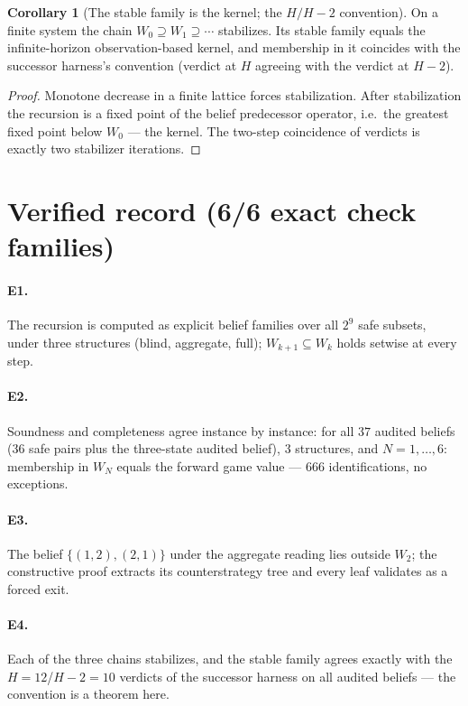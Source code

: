 \documentclass[10pt,twocolumn]{article}
\theoremstyle{definition}
\newtheorem{corollary}{Corollary}
\begin{document}
\begin{corollary}[The stable family is the kernel; the $H/H-2$ convention]
On a finite system the chain $W_0\supseteq W_1\supseteq\cdots$ stabilizes.
Its stable family equals the infinite-horizon observation-based kernel, and
membership in it coincides with the successor harness's convention
(verdict at $H$ agreeing with the verdict at $H-2$).
\end{corollary}
\begin{proof}
Monotone decrease in a finite lattice forces stabilization. After
stabilization the recursion is a fixed point of the belief predecessor
operator, i.e.\ the greatest fixed point below $W_0$ --- the kernel. The
two-step coincidence of verdicts is exactly two stabilizer iterations.
\end{proof}

\section{Verified record (6/6 exact check families)}

\paragraph{E1.} The recursion is computed as explicit belief families over
all $2^9$ safe subsets, under three structures (blind, aggregate, full);
$W_{k+1}\subseteq W_k$ holds setwise at every step.

\paragraph{E2.} Soundness and completeness agree instance by instance: for
all $37$ audited beliefs ($36$ safe pairs plus the three-state audited
belief), $3$ structures, and $N=1,\dots,6$: membership in $W_N$ equals the
forward game value --- $666$ identifications, no exceptions.

\paragraph{E3.} The belief $\{(1,2),(2,1)\}$ under the aggregate reading
lies outside $W_2$; the constructive proof extracts its counterstrategy
tree and every leaf validates as a forced exit.

\paragraph{E4.} Each of the three chains stabilizes, and the stable family
agrees exactly with the $H=12$/$H-2=10$ verdicts of the successor harness
on all audited beliefs --- the convention is a theorem here.
\end{document}
